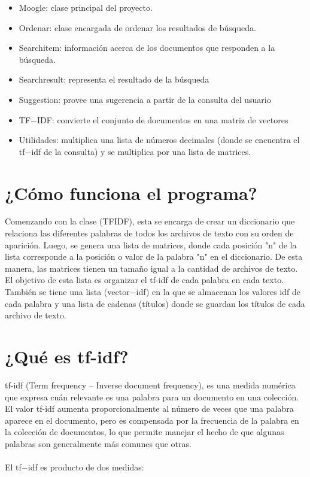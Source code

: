 \documentclass{article}
\begin{document}
\begin{itemize}
    \item  Moogle: clase principal del proyecto.
    \item  Ordenar: clase encargada de ordenar los resultados de búsqueda.
    \item  Searchitem: información acerca de los documentos que responden a la búsqueda.
    \item  Searchresult: representa el resultado de la búsqueda
    \item  Suggestion: provee una sugerencia a partir de la consulta del usuario
    \item  TF$-$IDF: convierte el conjunto de documentos en una matriz de vectores
    \item  Utilidades: multiplica una lista de números decimales (donde se encuentra el tf$-$idf 
de la consulta) y se multiplica por una lista de matrices.   
\end{itemize}


\vspace{10pt}

\section* {¿Cómo funciona el programa?}
Comenzando con la clase (TFIDF), esta se encarga de crear un diccionario que 
relaciona las diferentes palabras de todos los archivos de texto con su orden de 
aparición. Luego, se genera una lista de matrices, donde cada posición "n" de la lista 
corresponde a la posición o valor de la palabra "n" en el diccionario. De esta 
manera, las matrices tienen un tamaño igual a la cantidad de archivos de texto. El 
objetivo de esta lista es organizar el tf-idf de cada palabra en cada texto.
También se tiene una lista (vector$-$idf) en la que se almacenan los valores idf de 
cada palabra y una lista de cadenas (títulos) donde se guardan los títulos de cada 
archivo de texto.

\vspace{10pt}

\section*{¿Qué es tf-idf?}
tf-idf (Term frequency – Inverse document frequency), es una medida numérica que 
expresa cuán relevante es una palabra para un documento en una colección. El 
valor tf-idf aumenta proporcionalmente al número de veces que una palabra 
aparece en el documento, pero es compensada por la frecuencia de la palabra en 
la colección de documentos, lo que permite manejar el hecho de que algunas 
palabras son generalmente más comunes que otras.\\ \\ El tf$-$idf es producto de dos medidas:
\end{document}
